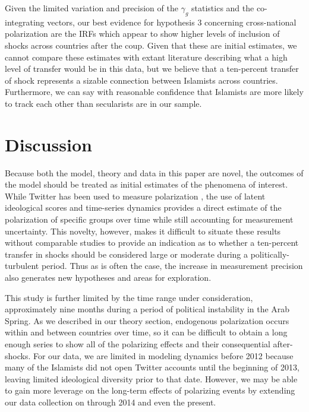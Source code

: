 \documentclass[12pt]{article}
\begin{document}
Given the limited variation and precision of the $\gamma_g$ statistics and the co-integrating vectors, our best evidence for hypothesis 3 concerning cross-national polarization are the IRFs which appear to show higher levels of inclusion of shocks across countries after the coup. Given that these are initial estimates, we cannot compare these estimates with extant literature describing what a high level of transfer would be in this data, but we believe that a ten-percent transfer of shock represents a sizable connection between Islamists across countries. Furthermore, we can say with reasonable confidence that Islamists are more likely to track each other than secularists are in our sample.

\section*{Discussion}

Because both the model, theory and data in this paper are novel, the outcomes of the model should be treated as initial estimates of the phenomena of interest. While Twitter has been used to measure polarization \parencite{jamaletal2015,hu2012lda}, the use of latent ideological scores and time-series dynamics provides a direct estimate of the polarization of specific groups over time while still accounting for measurement uncertainty. This novelty, however, makes it difficult to situate these results without comparable studies to provide an indication as to whether a ten-percent transfer in shocks should be considered large or moderate during a politically-turbulent period. Thus as is often the case, the increase in measurement precision also generates new hypotheses and areas for exploration.

This study is further limited by the time range under consideration, approximately nine months during a period of political instability in the Arab Spring. As we described in our theory section, endogenous polarization occurs within and between countries over time, so it can be difficult to obtain a long enough series to show all of the polarizing effects and their consequential after-shocks. For our data, we are limited in modeling dynamics before 2012 because many of the Islamists did not open Twitter accounts until the beginning of 2013, leaving limited ideological diversity prior to that date. However, we may be able to gain more leverage on the long-term effects of polarizing events by extending our data collection on through 2014 and even the present.
\end{document}
